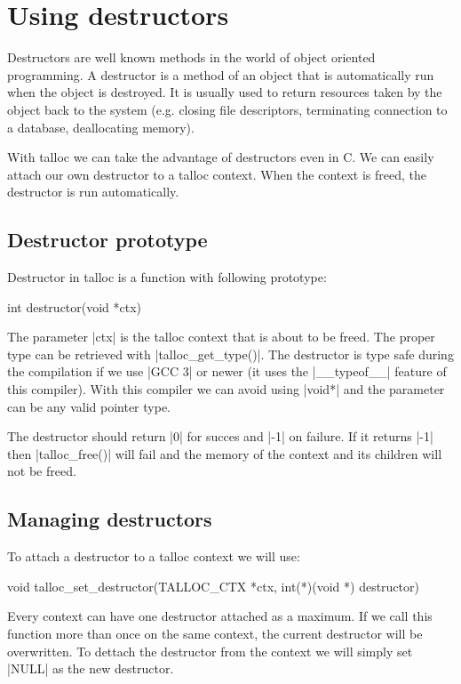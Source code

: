\section{Using destructors}
\label{talloc:sec:destructors}

Destructors are well known methods in the world of object oriented programming.
A destructor is a method of an object that is automatically run when the object
is destroyed. It is usually used to return resources taken by the object back to
the system (e.g. closing file descriptors, terminating connection to a database,
deallocating memory).

With talloc we can take the advantage of destructors even in C. We can easily
attach our own destructor to a talloc context. When the context is freed, the
destructor is run automatically.

\subsection{Destructor prototype}

Destructor in talloc is a function with following prototype:

\begin{funcproto}
int destructor(void *ctx)
\end{funcproto}
\funclistend
The parameter |ctx| is the talloc context that is about to be freed. The proper
type can be retrieved with |talloc_get_type()|. The destructor is type safe during
the compilation if we use |GCC 3| or newer (it uses the |__typeof__|
feature of this compiler). With this compiler we can avoid 
using |void*| and the parameter can be any valid pointer type.

The destructor should return |0| for succes and |-1| on failure. If it returns
|-1| then |talloc_free()| will fail and the memory of the context and its
children will not be freed.

\subsection{Managing destructors}

To attach a destructor to a talloc context we will use:

\begin{funcproto}
void talloc_set_destructor(TALLOC_CTX *ctx,
                           int(*)(void *) destructor) 
\end{funcproto}
\funclistend
Every context can have one destructor attached as a maximum. If we call this
function more than once on the same context, the current destructor will be
overwritten. To dettach the destructor from the context we will simply set
|NULL| as the new destructor.

